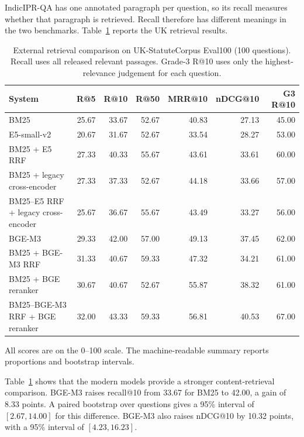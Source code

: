 \documentclass[pdflatex,sn-basic]{sn-jnl}%
\theoremstyle{thmstyleone}%
\theoremstyle{thmstyletwo}%
\theoremstyle{thmstylethree}%
\begin{document}
IndicIPR-QA has one annotated paragraph per question, so its recall measures
whether that paragraph is retrieved. Recall therefore has different meanings
in the two benchmarks. Table~\ref{tab:uk_external_retrieval} reports the UK
retrieval results.

\begin{table}[!htbp]
    \caption{External retrieval comparison on UK-StatuteCorpus Eval100
    (100 questions). Recall uses all released relevant passages. Grade-3
    R@10 uses only the highest-relevance judgement for each question.}
    \label{tab:uk_external_retrieval}
    \centering
    \scriptsize
    \setlength{\tabcolsep}{2.3pt}
    \begin{tabular}{@{}lrrrrrr@{}}
        \toprule
        System & R@5 & R@10 & R@50 & MRR@10 & nDCG@10 & G3 R@10 \\
        \midrule
        BM25
        & 25.67 & 33.67 & 52.67 & 40.83 & 27.13 & 45.00 \\
        E5-small-v2
        & 20.67 & 31.67 & 52.67 & 33.54 & 28.27 & 53.00 \\
        BM25 + E5 RRF
        & 27.33 & 40.33 & 55.67 & 43.61 & 33.61 & 60.00 \\
        BM25 + legacy cross-encoder
        & 27.33 & 37.33 & 52.67 & 44.18 & 33.66 & 57.00 \\
        BM25--E5 RRF + legacy cross-encoder
        & 25.67 & 36.67 & 55.67 & 43.49 & 33.27 & 56.00 \\
        \midrule
        BGE-M3
        & 29.33 & 42.00 & 57.00 & 49.13 & 37.45 & 62.00 \\
        BM25 + BGE-M3 RRF
        & 31.33 & 40.67 & 59.33 & 47.32 & 34.21 & 61.00 \\
        BM25 + BGE reranker
        & 30.67 & 40.67 & 52.67 & 55.87 & 38.32 & 61.00 \\
        BM25--BGE-M3 RRF + BGE reranker
        & 32.00 & 43.33 & 59.33 & 56.81 & 40.53 & 67.00 \\
        \bottomrule
    \end{tabular}
    \begin{flushleft}
        {\scriptsize All scores are on the 0--100 scale. The
        machine-readable summary reports proportions and bootstrap
        intervals.}
    \end{flushleft}
\end{table}

Table~\ref{tab:uk_external_retrieval} shows that the modern models provide a
stronger content-retrieval comparison. BGE-M3 raises recall@10 from 33.67
for BM25 to 42.00, a gain of 8.33 points. A paired bootstrap over questions
gives a 95\% interval of $[2.67,14.00]$ for this difference. BGE-M3 also
raises nDCG@10 by 10.32 points, with a 95\% interval of
$[4.23,16.23]$.
\end{document}
